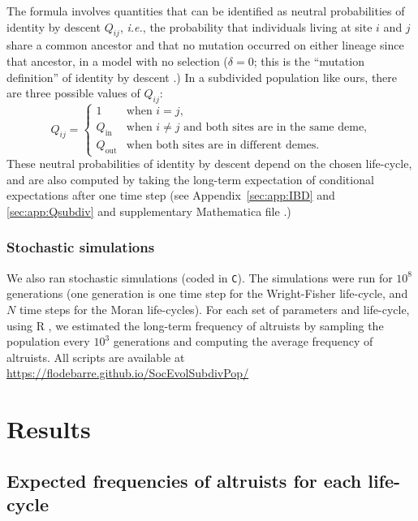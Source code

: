 \documentclass[11pt, letterpaper]{article}
\newcommand{\ie}{\textit{i.e.}}
\newcommand{\appname}[0]{Appendix}
\newcommand{\inn}{\textrm{in}}
\newcommand{\out}{\textrm{out}}
\newcommand{\Qin}{Q_{\inn}}
\newcommand{\Qout}{Q_{\out}}
\newcommand{\selstr}{\delta}
\begin{document}
The formula involves quantities that can be identified as neutral probabilities of identity by descent $Q_{ij}$, \ie, the probability that individuals living at site $i$  and $j$ share a common ancestor and that no mutation occurred on either lineage since that ancestor, in a model with no selection ($\selstr=0$; this is the ``mutation definition'' of identity by descent \citep{RoussetBilliard2000}.) 
In a subdivided population like ours, there are three possible values of $Q_{ij}$:
%
\begin{equation}\label{eq:Q3}
Q_{ij} = \begin{cases} 1 & \textrm{when $i=j$,} \\
\Qin & \textrm{when $i\neq j$ and both sites are in the same deme,}\\
\Qout & \textrm{when both sites are in different demes.}
\end{cases}
\end{equation}
%
These neutral probabilities of identity by descent depend on the chosen life-cycle, and are also computed by taking the long-term expectation of conditional expectations after one time step (see \appname~\ref{sec:app:IBD} and \ref{sec:app:Qsubdiv} and supplementary Mathematica file \citep{Mathematica11}.) 

\subsubsection{Stochastic simulations}
We also ran stochastic simulations (coded in \texttt{C}). The simulations were run for $10^8$ generations (one generation is one time step for the Wright-Fisher life-cycle, and $N$ time steps for the Moran life-cycles). For each set of parameters and life-cycle, using R \citep{R2015}, we estimated the long-term frequency of altruists by sampling the population every $10^3$ generations and computing the average frequency of altruists. 
%
All scripts are available at \\
{\small \url{https://flodebarre.github.io/SocEvolSubdivPop/}} 

\section{Results}


\subsection{Expected frequencies of altruists for each life-cycle}
\end{document}

